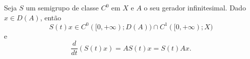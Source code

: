 
\begin{theorem}\label{th-der}
Seja $S$ um semigrupo de classe $C^0$ em $X$ e $A$ o seu gerador infinitesimal. Dado $x\in D(A)$, então 
\[S(t)x\in C^0([0,+\infty);D(A))\cap C^1([0,+\infty);X)\]
e
\begin{equation}\label{eq-der}
\frac{d}{dt}\left(S(t)x\right)=AS(t)x=S(t)Ax.
\end{equation}

\end{theorem}
